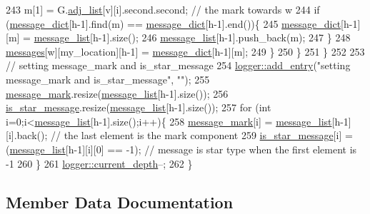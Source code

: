 \begin{DoxyCode}
243         m[1] = G.\hyperlink{classmarked__graph_a1a0bf7ca413a278763f7c878b3b6fd6f}{adj\_list}[v][i].second.second; \textcolor{comment}{// the mark towards w}
244         \textcolor{keywordflow}{if} (\hyperlink{classgraph__message_ab54d89b122c2b1322da0d5db2043fb84}{message\_dict}[h-1].find(m) == \hyperlink{classgraph__message_ab54d89b122c2b1322da0d5db2043fb84}{message\_dict}[h-1].end())\{
245           \hyperlink{classgraph__message_ab54d89b122c2b1322da0d5db2043fb84}{message\_dict}[h-1][m] = \hyperlink{classgraph__message_aa17fdb629b423343edfafa97252763ef}{message\_list}[h-1].size();
246           \hyperlink{classgraph__message_aa17fdb629b423343edfafa97252763ef}{message\_list}[h-1].push\_back(m);
247         \}
248         \hyperlink{classgraph__message_aac77e098f0acf9650116a8e51fe3b4b7}{messages}[w][my\_location][h-1] = \hyperlink{classgraph__message_ab54d89b122c2b1322da0d5db2043fb84}{message\_dict}[h-1][m];
249       \}
250     \}
251   \}
252 
253   \textcolor{comment}{// setting message\_mark and is\_star\_message}
254   \hyperlink{classlogger_a710163deb17bc81f70d53d285b8ac9ac}{logger::add\_entry}(\textcolor{stringliteral}{"setting message\_mark and is\_star\_message"}, \textcolor{stringliteral}{""});
255   \hyperlink{classgraph__message_a49d9af5150daf0599c29fe18cb032fa5}{message\_mark}.resize(\hyperlink{classgraph__message_aa17fdb629b423343edfafa97252763ef}{message\_list}[h-1].size());
256   \hyperlink{classgraph__message_a55ff5531a0043106369e84a7bc45e22d}{is\_star\_message}.resize(\hyperlink{classgraph__message_aa17fdb629b423343edfafa97252763ef}{message\_list}[h-1].size());
257   \textcolor{keywordflow}{for} (\textcolor{keywordtype}{int} i=0;i<\hyperlink{classgraph__message_aa17fdb629b423343edfafa97252763ef}{message\_list}[h-1].size();i++)\{
258     \hyperlink{classgraph__message_a49d9af5150daf0599c29fe18cb032fa5}{message\_mark}[i] = \hyperlink{classgraph__message_aa17fdb629b423343edfafa97252763ef}{message\_list}[h-1][i].back(); \textcolor{comment}{// the last element is the mark
       component}
259     \hyperlink{classgraph__message_a55ff5531a0043106369e84a7bc45e22d}{is\_star\_message}[i] = (\hyperlink{classgraph__message_aa17fdb629b423343edfafa97252763ef}{message\_list}[h-1][i][0] == -1); \textcolor{comment}{// message is star
       type when the first element is -1}
260   \}
261   \hyperlink{classlogger_a9d29b49bd318a719a8e85b59eac54fe0}{logger::current\_depth}--;
262 \}
\end{DoxyCode}


\subsection{Member Data Documentation}
\mbox{\label{classgraph__message_a45dfd061b7bc73572e5132fbf66efd55}} 

